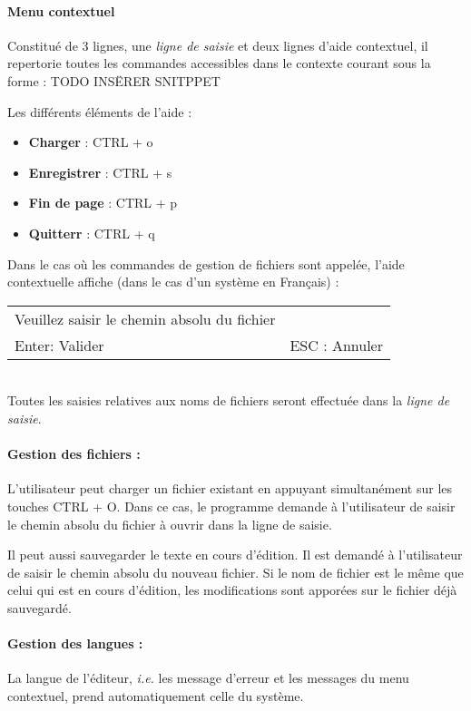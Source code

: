 \paragraph{Menu contextuel}
Constitué de 3 lignes, une \textsl{ligne de saisie} et deux lignes d'aide contextuel, il repertorie toutes les commandes accessibles dans le contexte courant sous la forme :
TODO INSËRER SNITPPET

Les différents éléments de l'aide :
\begin{itemize}
	\item \textbf{Charger} : \og CTRL + o\fg
	\item \textbf{Enregistrer} : \og CTRL + s\fg
	\item \textbf{Fin de page} : \og CTRL + p\fg
	\item \textbf{Quitterr} : \og CTRL + q\fg
\end{itemize}

Dans le cas où les commandes de gestion de fichiers sont appelée, l'aide contextuelle affiche (dans le cas d'un système en Français) :\\
\begin{tabular}{ll}
	Veuillez saisir le chemin absolu du fichier &~\\
	Enter: Valider & ESC : Annuler\\
\end{tabular}
~\\
Toutes les saisies relatives aux noms de fichiers seront effectuée dans la \textsl{ligne de saisie}.

\paragraph{Gestion des fichiers :}
L'utilisateur peut charger un fichier existant en appuyant simultanément sur les touches \og CTRL + O\fg. Dans ce cas, le programme demande à l'utilisateur de saisir le chemin absolu du fichier à ouvrir dans la ligne de saisie.

Il peut aussi sauvegarder le texte en cours d'édition. Il est demandé à l'utilisateur de saisir le chemin absolu du nouveau fichier. Si le nom de fichier est le même que celui qui est en cours d'édition, les modifications sont apporées sur le fichier déjà sauvegardé.

\paragraph{Gestion des langues :}
La langue de l'éditeur, \textsl{i.e.} les message d'erreur et les messages du menu contextuel, prend automatiquement celle du système.


